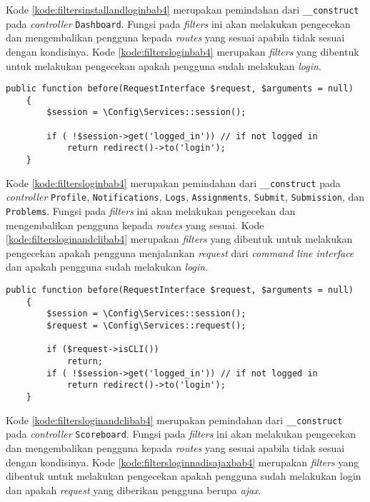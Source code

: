 Kode \ref{kode:filtersinstallandloginbab4} merupakan pemindahan dari \texttt{\_\_construct} pada \textit{controller} \texttt{Dashboard}. Fungsi pada \textit{filters} ini akan melakukan pengecekan dan mengembalikan pengguna kepada \textit{routes} yang sesuai apabila tidak sesuai dengan kondisinya. Kode \ref{kode:filtersloginbab4} merupakan \textit{filters} yang dibentuk untuk melakukan pengecekan apakah pengguna sudah melakukan \textit{login}.
\begin{lstlisting}[caption=Pemindahan kode pada \textit{Filters}, label=kode:filtersloginbab4]
	public function before(RequestInterface $request, $arguments = null)
    {
        $session = \Config\Services::session();

        if ( !$session->get('logged_in')) // if not logged in
			return redirect()->to('login');
    }
\end{lstlisting}

Kode \ref{kode:filtersloginbab4} merupakan pemindahan dari \texttt{\_\_construct} pada \textit{controller} \texttt{Profile}, \texttt{Notifications}, \texttt{Logs}, \texttt{Assignments}, \texttt{Submit}, \texttt{Submission}, dan \texttt{Problems}. Fungsi pada \textit{filters} ini akan melakukan pengecekan dan mengembalikan pengguna kepada \textit{routes} yang sesuai. Kode \ref{kode:filtersloginandclibab4} merupakan \textit{filters} yang dibentuk untuk melakukan pengecekan apakah pengguna menjalankan \textit{request} dari \textit{command line interface} dan apakah pengguna sudah melakukan \textit{login}.

\begin{lstlisting}[caption=Pemindahan kode pada \textit{Filters}, label=kode:filtersloginandclibab4]
	public function before(RequestInterface $request, $arguments = null)
    {   
        $session = \Config\Services::session();
        $request = \Config\Services::request();

        if ($request->isCLI())
            return;
        if ( !$session->get('logged_in')) // if not logged in
            return redirect()->to('login');
    }
\end{lstlisting}

Kode \ref{kode:filtersloginandclibab4} merupakan pemindahan dari \texttt{\_\_construct} pada \textit{controller}  \texttt{Scoreboard}. Fungsi pada \textit{filters} ini akan melakukan pengecekan dan mengembalikan pengguna kepada \textit{routes} yang sesuai apabila tidak sesuai dengan kondisinya. Kode \ref{kode:filtersloginnadisajaxbab4} merupakan \textit{filters} yang dibentuk untuk melakukan pengecekan apakah pengguna sudah melakukan login dan apakah \textit{request} yang diberikan pengguna berupa \textit{ajax}.

